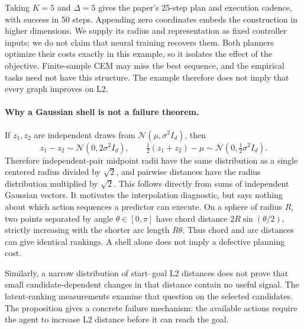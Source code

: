 \documentclass{article} %
\theoremstyle{definition}
\theoremstyle{remark}
\begin{document}
Taking $K=5$ and $\Delta=5$ gives the paper's 25-step plan and execution cadence,
with success in 50 steps. Appending zero coordinates embeds the construction in higher
dimensions. We supply its radius and representation as fixed controller inputs;
we do not claim that neural training recovers them. Both planners optimize their
costs exactly in this example, so it isolates the effect of the objective.
Finite-sample CEM may miss the best sequence, and the empirical tasks need not have
this structure. The example therefore does not imply that every graph improves on L2.

\paragraph{Why a Gaussian shell is not a failure theorem.}
If $z_1,z_2$ are independent draws from $\mathcal N(\mu,\sigma^2I_d)$, then
\[
 z_1-z_2\sim\mathcal N(0,2\sigma^2I_d),\qquad
 \tfrac12(z_1+z_2)-\mu\sim\mathcal N(0,\tfrac12\sigma^2I_d).
\]
Therefore independent-pair midpoint radii have the same distribution as a single
centered radius divided by $\sqrt2$, and pairwise distances have the radius
distribution multiplied by $\sqrt2$. This follows directly from sums of independent
Gaussian vectors. It motivates the interpolation diagnostic, but says nothing
about which action sequences a predictor can execute.
On a sphere of radius $R$, two points separated by angle $\theta\in[0,\pi]$ have
chord distance $2R\sin(\theta/2)$, strictly increasing with the shorter arc length
$R\theta$. Thus chord and arc distances can give identical rankings.
A shell alone does not imply a defective planning cost.

Similarly, a narrow distribution of start--goal L2 distances does not prove that
small candidate-dependent changes in that distance contain no useful signal.
The latent-ranking measurements examine that question on the selected candidates.
The proposition gives a concrete failure mechanism: the available actions require
the agent to increase L2 distance before it can reach the goal.
\end{document}
